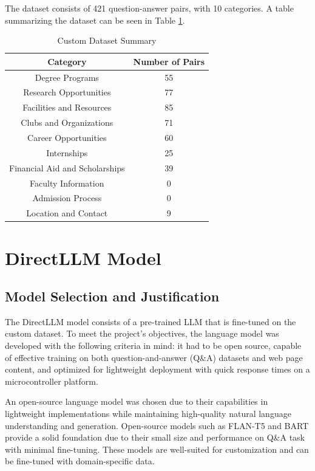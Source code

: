 \documentclass[conference]{IEEEtran}
\begin{document}
The dataset consists of 421 question-answer pairs, with 10 categories.
A table summarizing the dataset can be seen in Table \ref{tab:dataset}.
\begin{table}[h]
    \centering
    \caption{Custom Dataset Summary}
    \begin{tabular}{|c|c|}
        \hline
        \textbf{Category} & \textbf{Number of Pairs} \\ \hline
        Degree Programs & 55 \\ \hline
        Research Opportunities & 77 \\ \hline
        Facilities and Resources & 85 \\ \hline
        Clubs and Organizations & 71 \\ \hline
        Career Opportunities & 60 \\ \hline
        Internships & 25 \\ \hline
        Financial Aid and Scholarships & 39 \\ \hline
        Faculty Information & 0 \\ \hline
        Admission Process & 0 \\ \hline
        Location and Contact & 9 \\ \hline
    \end{tabular}
    \label{tab:dataset}
\end{table}

\section{DirectLLM Model}
\subsection{Model Selection and Justification}
The DirectLLM model consists of a pre-trained LLM that is fine-tuned on the custom dataset.
To meet the project's objectives, the language model was developed with the following criteria in mind: it had to be open source, capable of effective training on both question-and-answer (Q\&A) datasets and web page content, and optimized for lightweight deployment with quick response times on a microcontroller platform.

An open-source language model was chosen due to their capabilities in lightweight implementations while maintaining high-quality natural language understanding and generation.
Open-source models such as FLAN-T5 \cite{b8} and BART \cite{b9} provide a solid foundation due to their small size and performance on Q\&A task with minimal fine-tuning. 
These models are well-suited for customization and can be fine-tuned with domain-specific data.
\end{document}
